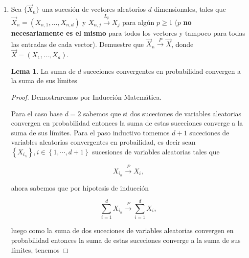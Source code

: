 \documentclass[letterpaper]{article}
\theoremstyle{definition}
\theoremstyle{lemathm}
\newtheorem{lema}{Lema}
\theoremstyle{lemademthm}
\newcommand{\limninf}{\lim_{n\to\infty}}
\newcommand{\abs}[1]{\left| #1 \right| }
\newcommand{\bracs}[1]{\left[ #1 \right] }
\newcommand{\set}[1]{\left \{ #1 \right\} }
\newcommand{\1}{\mathbbm{1}}
\begin{document}
\begin{enumerate}
\begin{enumerate}
\begin{proof}
				por continuidad de valor absoluto y $x^p$ tenemos que

				\[\limninf \mathbb{E}\bracs{\abs{\frac{|X_n|}{1+|Y_n|} - \frac{|X|}{1+|Y|}}^p} = \mathbb{E}\bracs{\abs{\limninf\frac{|X_n|}{1+|Y_n|} - \frac{|X|}{1+|Y|}}^p}\]

				luego por el inciso anterior concluimos

				\[\limninf \mathbb{E}\bracs{\abs{\frac{|X_n|}{1+|Y_n|} - \frac{|X|}{1+|Y|}}^p} = \mathbb{E}\bracs{\abs{\frac{|X|}{1+|Y|} - \frac{|X|}{1+|Y|}}^p} = 0,\]

				por lo tanto concluimos quiere

				\[\frac{|X_n|}{1+|Y_n|} \xrightarrow{L_p} \frac{|X|}{1+|Y|}\]

			\end{proof}
		\end{enumerate}

		\newpage
		
		\item Sea $\{\vec{X}_n\}$ una sucesión de vectores aleatorios $d$-dimensionales, tales que $\vec{X}_n=(X_{n,1},\dots,X_{n,d})$ y $X_{n,j}\overset{L_p}{\to}X_j$ para algún $p\geq 1$ ($p$ \textbf{no necesariamente es el mismo} para todos los vectores y tampoco para todas las entradas de cada vector). Demuestre que $\vec{X}_n\overset{P}{\to} \vec{X}$, donde $\vec{X}=(X_1,\dots,X_d)$.
		
		\begin{lema}
			La suma de $d$ suceciones convergentes en probabilidad convergen a la suma de sus límites
		\end{lema}

		\begin{proof}
			Demostraremos por Inducción Matemática.
			
			Para el caso base $d = 2$ sabemos que si dos suceciones de variables aleatorias convergen en probabilidad entonces la suma de estas suceciones converge a la suma de sus límites. Para el paso inductivo tomemos $d+1$ suceciones de variables aleatorias convergentes en probailidad, es decir sean $\set{X_{i_n}}, i\in\set{1,\cdots,d+1}$ sucesiones de variables aleatorias tales que 

			\[X_{i_n} \xrightarrow{P} X_i,\]

			ahora sabemos que por hípotesis de inducción 

			\[\sum_{i=1}^d X_{i_n} \xrightarrow{P} \sum_{i=1}^d X_i,\]

			luego como la suma de dos suceciones de variables aleatorias convergen en probabilidad entonces la suma de estas suceciones converge a la suma de sus límites, tenemos


\end{proof}
\end{enumerate}
\end{document}
